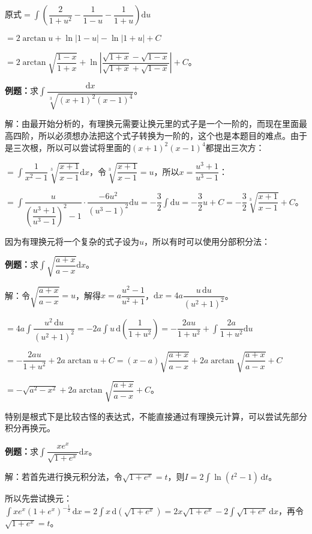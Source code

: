\documentclass[UTF8, 12pt]{ctexart}
\begin{document}
原式$=\displaystyle{\int\left(\dfrac{2}{1+u^2}-\dfrac{1}{1-u}-\dfrac{1}{1+u}\right)\textrm{d}u}$

$=2\arctan u+\ln\vert1-u\vert-\ln\vert1+u\vert+C$

$=2\arctan\sqrt{\dfrac{1-x}{1+x}}+\ln\left\vert\dfrac{\sqrt{1+x}-\sqrt{1-x}}{\sqrt{1+x}+\sqrt{1-x}}\right\vert+C$。

\textbf{例题：}求$\displaystyle{\int\dfrac{\textrm{d}x}{\sqrt[3]{(x+1)^2(x-1)^4}}}$。

解：由最开始分析的，有理换元需要让换元里的式子是一个一阶的，而现在里面最高四阶，所以必须想办法把这个式子转换为一阶的，这个也是本题目的难点。由于是三次根，所以可以尝试将里面的$(x+1)^2(x-1)^4$都提出三次方：

$=\displaystyle{\int\dfrac{1}{x^2-1}\sqrt[3]{\dfrac{x+1}{x-1}}\textrm{d}x}$，令$\sqrt[3]{\dfrac{x+1}{x-1}}=u$，所以$x=\dfrac{u^3+1}{u^3-1}$：

$=\displaystyle{\int\dfrac{u}{\left(\dfrac{u^3+1}{u^3-1}\right)^2-1}\cdot\dfrac{-6u^2}{(u^3-1)^2}\textrm{d}u=-\dfrac{3}{2}\int\textrm{d}u}=-\dfrac{3}{2}u+C=-\dfrac{3}{2}\sqrt[3]{\dfrac{x+1}{x-1}}+C $。

因为有理换元将一个复杂的式子设为$u$，所以有时可以使用分部积分法：\medskip

\textbf{例题：}求$\displaystyle{\int\sqrt{\dfrac{a+x}{a-x}}\textrm{d}x}$。\medskip

解：令$\sqrt{\dfrac{a+x}{a-x}}=u$，解得$x=a\dfrac{u^2-1}{u^2+1}$，$\textrm{d}x=4a\dfrac{u\,\textrm{d}u}{(u^2+1)^2}$。

$=\displaystyle{4a\int\dfrac{u^2\,\textrm{d}u}{(u^2+1)^2}=-2a\int u\,\textrm{d}\left(\dfrac{1}{1+u^2}\right)=-\dfrac{2au}{1+u^2}+\int\dfrac{2a}{1+u^2}\textrm{d}u}$

$=-\dfrac{2au}{1+u^2}+2a\arctan u+C=(x-a)\sqrt{\dfrac{a+x}{a-x}}+2a\arctan\sqrt{\dfrac{a+x}{a-x}}+C$

$=-\sqrt{a^2-x^2}+2a\arctan\sqrt{\dfrac{a+x}{a-x}}+C$。

特别是根式下是比较古怪的表达式，不能直接通过有理换元计算，可以尝试先部分积分再换元。

\textbf{例题：}求$\displaystyle{\int\dfrac{xe^x}{\sqrt{1+e^x}}\textrm{d}x}$。

解：若首先进行换元积分法，令$\sqrt{1+e^x}=t$，则$I=2\int\ln(t^2-1)\,\textrm{d}t$。

所以先尝试换元：$\int xe^x(1+e^x)^{-\frac{1}{2}}\,\textrm{d}x=2\int x\,\textrm{d}(\sqrt{1+e^x})=2x\sqrt{1+e^x}-2\int\sqrt{1+e^x}\,\textrm{d}x$，再令$\sqrt{1+e^x}=t$。
\end{document}
